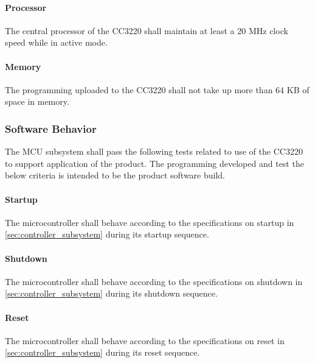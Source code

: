 \paragraph{Processor} The central processor of the CC3220 shall maintain at
least a 20 MHz clock speed while in active mode.

\paragraph{Memory} The programming uploaded to the CC3220 shall not take up
more than 64 KB of space in memory.

\subsubsection{Software Behavior} The MCU subsystem shall pass the following
tests related to use of the CC3220 to support application of the product. The
programming developed and test the below criteria is intended to be the
product software build.

\paragraph{Startup} The microcontroller shall behave according to the specifications on startup in \autoref{sec:controller_subsystem} during its startup sequence.

\paragraph{Shutdown} The microcontroller shall behave according to the specifications on shutdown in \autoref{sec:controller_subsystem} during its shutdown sequence.

\paragraph{Reset} The microcontroller shall behave according to the specifications on reset in \autoref{sec:controller_subsystem} during its reset sequence.

